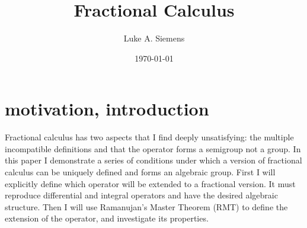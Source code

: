 \documentclass[%
 onecolumn,
 amsmath, amssymb, aps, pra, 10pt
]{revtex4-2}
\begin{document}
\title{Fractional Calculus}%
\author{Luke A. Siemens}
\noaffiliation
\date{\today}
\maketitle

\section{motivation, introduction}
Fractional calculus has two aspects that I find deeply unsatisfying: the multiple incompatible definitions and that the operator forms a semigroup not a group. In this paper I demonstrate a series of conditions under which a version of fractional calculus can be uniquely defined and forms an algebraic group. First I will explicitly define which operator will be extended to a fractional version. It must reproduce differential and integral operators and have the desired algebraic structure. Then I will use Ramanujan's Master Theorem (RMT) to define the extension of the operator, and investigate its properties.  
\end{document}
